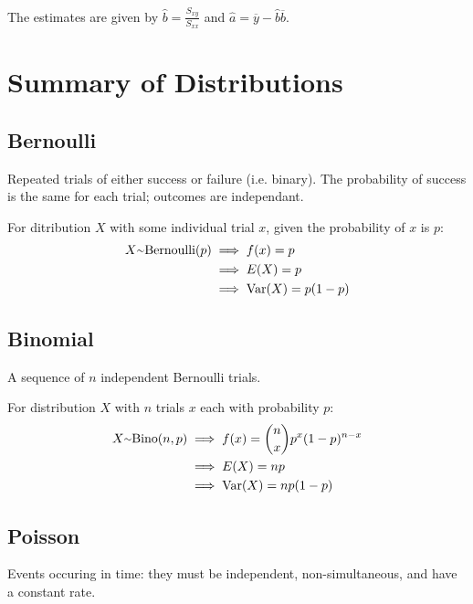 \documentclass[12pt]{article}
\begin{document}
The estimates are given by $\hat{b} = \frac{S_{xy}}{S_{xx}}$ and $\hat{a} = \overline{y} - \hat{b}\overline{b}$.























\newpage

\section*{Summary of Distributions}
\subsection*{Bernoulli}
Repeated trials of either success or failure (i.e. binary). The probability of success is the same for each trial; outcomes are independant.

For ditribution $X$ with some individual trial $x$, given the probability of $x$ is $p$:
\begin{align*}
X \ttilde \text{Bernoulli}(p) &\implies f(x) = p\\
                              &\implies E(X) = p\\
                              &\implies \text{Var}(X) = p(1-p)
\end{align*}

\subsection*{Binomial}
A sequence of $n$ independent Bernoulli trials.

For distribution $X$ with $n$ trials $x$ each with probability $p$:
\begin{align*}
X \ttilde \text{Bino}(n, p)  &\implies f(x) = {n \choose x} p^x (1-p)^{n-x}\\
                             &\implies E(X) = np\\
                             &\implies \text{Var}(X) = np(1-p)
\end{align*}

\subsection*{Poisson}
Events occuring in time: they must be independent, non-simultaneous, and have a constant rate.
\end{document}
